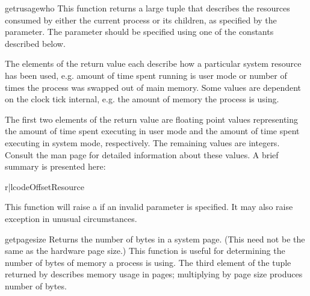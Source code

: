 \begin{funcdesc}{getrusage}{who}
  This function returns a large tuple that describes the resources
  consumed by either the current process or its children, as specified
  by the  parameter.  The  parameter should be
  specified using one of the  constants described
  below.

  The elements of the return value each
  describe how a particular system resource has been used, e.g. amount
  of time spent running is user mode or number of times the process was
  swapped out of main memory. Some values are dependent on the clock
  tick internal, e.g. the amount of memory the process is using.

  The first two elements of the return value are floating point values
  representing the amount of time spent executing in user mode and the
  amount of time spent executing in system mode, respectively. The
  remaining values are integers. Consult the 
  man page for detailed information about these values. A brief
  summary is presented here:

\begin{tableii}{r|l}{code}{Offset}{Resource}
\end{tableii}

  This function will raise a  if an invalid
   parameter is specified. It may also raise
   exception in unusual circumstances.
\end{funcdesc}

\begin{funcdesc}{getpagesize}{}
  Returns the number of bytes in a system page. (This need not be the
  same as the hardware page size.) This function is useful for
  determining the number of bytes of memory a process is using. The
  third element of the tuple returned by  describes
  memory usage in pages; multiplying by page size produces number of
  bytes. 
\end{funcdesc}

